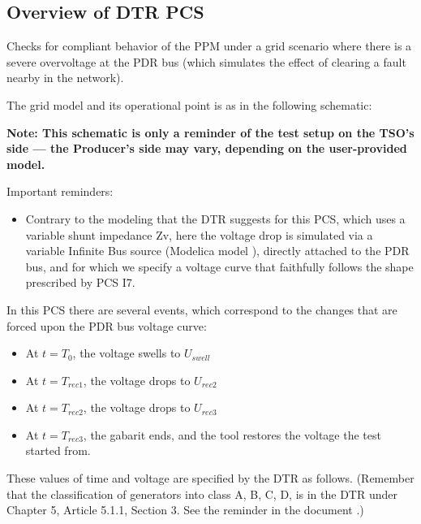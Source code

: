     \subsection{Overview of DTR PCS \DTRPcs{}}

    Checks for compliant behavior of the PPM under a grid scenario where
    there is a severe overvoltage at the PDR bus (which simulates the
    effect of clearing a fault nearby in the network).

    The grid model and its operational point is as in the following schematic:
    \begin{center}
        
    \end{center}
    \begin{center}
        \small \textbf{Note: This schematic is only a reminder of the test setup on the TSO's
        side --- the Producer's side may vary, depending on the user-provided model.}
    \end{center}

    \noindent Important reminders:
    \begin{itemize}
        \item Contrary to the modeling that the DTR suggests for this PCS, which uses a
        variable shunt impedance Zv, here the voltage drop is simulated via a variable
        Infinite Bus source (Modelica model ), directly
        attached to the PDR bus, and for which we specify a voltage curve that
        faithfully follows the shape prescribed by PCS I7.
    \end{itemize}

    In this PCS there are several events, which correspond to the changes that are
    forced upon the PDR bus voltage curve:
    \begin{itemize}
        \item At $t = T_{0}$, the voltage swells to $U_{swell}$
        \item At $t = T_{rec1}$, the voltage drops to $U_{rec2}$
        \item At $t = T_{rec2}$, the voltage drops to $U_{rec3}$
        \item At $t = T_{rec3}$, the gabarit ends, and the tool restores the
        voltage the test started from.
    \end{itemize}
    These values of time and voltage are specified by the DTR as follows. (Remember
    that the classification of generators into class A, B, C, D, is in the DTR under
    Chapter 5, Article 5.1.1, Section 3. See the reminder in the document
    .)

